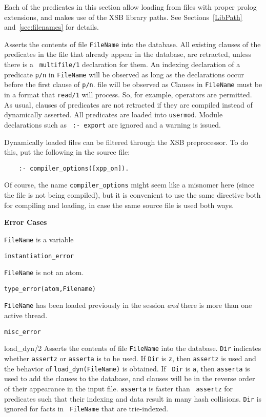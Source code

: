 Each of the predicates in this section allow loading from files with
proper prolog extensions, and makes use of the XSB library paths.  See
Sections~\ref{LibPath} and~\ref{sec:filenames} for details.

\begin{description}
\label{load_dyn/1}
    Asserts the contents of file {\tt FileName} into the database.
    All existing clauses of the predicates in the file that already
    appear in the database, are retracted, unless there is a {\tt
    multifile/1} declaration for them.  An indexing declaration of a
    predicate {\tt p/n} in {\tt FileName} will be observed as long as
    the declarations occur before the first clause of {\tt p/n}.  file
    will be observed as Clauses in {\tt FileName} must be in a format
    that {\tt read/1} will process.  So, for example, operators are
    permitted.  As usual, clauses of predicates are not retracted if
    they are compiled instead of dynamically asserted.  All predicates
    are loaded into {\tt usermod}.  Module declarations such as {\tt
    :- export} are ignored and a warning is issued.

    Dynamically loaded files can be filtered through the XSB preprocessor.
    To do this, put the following in the source file: 
    \begin{verbatim}
    :- compiler_options([xpp_on]).      
    \end{verbatim}

    Of course, the name \verb|compiler_options| might seem like a misnomer
    here (since the file is not being compiled), but it is convenient to
    use the same directive both for compiling and loading, in case the same
    source file is used both ways.

{\bf Error Cases}
\bi
\item 	{\tt FileName} is a variable
 \bi
 \item 	{\tt instantiation\_error}
 \ei
\item 	{\tt FileName} is not an atom.
 \bi
 \item 	{\tt type\_error(atom,Filename)}
 \ei
\item {\tt FileName} has been loaded previously in the session {\em and}
  there is more than one active thread.  
 \bi
 \item 	{\tt misc\_error}
 \ei
%
\ei

{load\_dyn/2}\label{load_dyn/2}
    Asserts the contents of file {\tt FileName} into the database.
    {\tt Dir} indicates whether {\tt assertz} or {\tt asserta} is to
    be used.  If {\tt Dir} is {\tt z}, then {\tt assertz} is used and
    the behavior of {\tt load\_dyn(FileName)} is obtained.  If {\tt
    Dir} is {\tt a}, then {\tt asserta} is used to add the clauses to
    the database, and clauses will be in the reverse order of their
    appearance in the input file.  {\tt asserta} is faster than {\tt
    assertz} for predicates such that their indexing and data result
    in many hash collisions.  {\tt Dir} is ignored for facts in {\tt
    FileName} that are trie-indexed.


\end{description}
